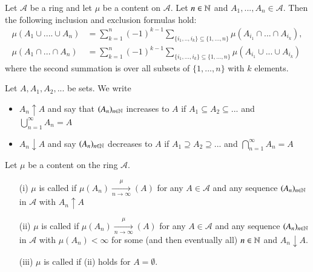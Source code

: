 \documentclass[12pt, a4paper, oneside, openright, titlepage]{book}
\begin{document}
\begin{thm}
    Let $\mathcal{A}$ be a ring and let $\mu$ be a content on $\mathcal{A}$. Let $n \in \mathbb N$ and $A_1,...,A_n \in \mathcal{A}$. Then the following inclusion and exclusion formulas hold: \begin{align*}
        \mu(A_1\cup....\cup A_n) &= \sum_{k=1}^n(-1)^{k-1}\sum_{\{i_1,..,i_k\}\subseteq \{1,...,n\}}\mu(A_{i_1}\cap...\cap A_{i_k}), \\
        \mu(A_1\cap ...\cap A_n) &= \sum_{k=1}^n(-1)^{k-1}\sum_{\{i_1,...,i_k\}\subseteq \{1,...,n\}}\mu(A_{i_1}\cup...\cup A_{i_k})
    \end{align*}
    where the second summation is over all subsets of $\{1,...,n\}$ with $k$ elements.
\end{thm}


\begin{defn}
    Let $A,A_1,A_2,...$ be sets. We write \begin{itemize}
        \item $A_n\uparrow A$ and say that $(A_n)_{n\in \mathbb N}$ increases to $A$ if $A_1\subseteq A_2\subseteq ...$ and $\bigcup_{n=1}^{\infty}A_n = A$
        \item $A_n\downarrow A$ and say $(A_n)_{n\in \mathbb N}$ decreases to $A$ if $A_1\supseteq A_2\supseteq ...$ and $\bigcap_{n=1}^{\infty}A_n = A$
    \end{itemize}
\end{defn}

\begin{defn}
    Let $\mu$ be a content on the ring $\mathcal{A}$. \begin{itemize}
        \item[(i)] $\mu$ is called  if $\mu(A_n)\xrightarrow[n\rightarrow \infty]\mu(A)$ for any $A \in \mathcal{A}$ and any sequence $(A_n)_{n\in \mathbb N}$ in $\mathcal{A}$ with $A_n\uparrow A$
        \item[(ii)] $\mu$ is called  if $\mu(A_n)\xrightarrow[n\rightarrow \infty]\mu(A)$ for any $A \in \mathcal{A}$ and any sequence $(A_n)_{n \in \mathbb N}$ in $\mathcal{A}$ with $\mu(A_n) < \infty$ for some (and then eventually all) $n \in \mathbb N$ and $A_n \downarrow A$.
        \item[(iii)] $\mu$ is called  if (ii) holds for $A = \emptyset$.
    \end{itemize}
\end{defn}
\end{document}
